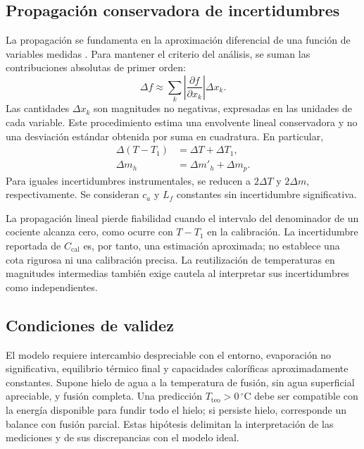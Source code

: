 \subsection{Propagación conservadora de incertidumbres}
La propagación se fundamenta en la aproximación diferencial de una función de variables medidas \cite{taylor}. Para mantener el criterio del análisis, se suman las contribuciones absolutas de primer orden:
\begin{equation}
  \Delta f\approx\sum_k\left|\frac{\partial f}{\partial x_k}\right|\Delta x_k.
  \label{eq:propagacion}
\end{equation}
Las cantidades $\Delta x_k$ son magnitudes no negativas, expresadas en las unidades de cada variable. Este procedimiento estima una envolvente lineal conservadora y no una desviación estándar obtenida por suma en cuadratura. En particular,
\begin{align}
  \Delta(T-T_1)&=\Delta T+\Delta T_1,\label{eq:incertidumbre_diferencia}\\
  \Delta m_h&=\Delta m'_h+\Delta m_p.\label{eq:incertidumbre_masa_hielo}
\end{align}
Para iguales incertidumbres instrumentales, se reducen a $2\Delta T$ y $2\Delta m$, respectivamente. Se consideran $c_a$ y $L_f$ constantes sin incertidumbre significativa.

La propagación lineal pierde fiabilidad cuando el intervalo del denominador de un cociente alcanza cero, como ocurre con $T-T_1$ en la calibración. La incertidumbre reportada de $C_{\mathrm{cal}}$ es, por tanto, una estimación aproximada; no establece una cota rigurosa ni una calibración precisa. La reutilización de temperaturas en magnitudes intermedias también exige cautela al interpretar sus incertidumbres como independientes.

\subsection{Condiciones de validez}
El modelo requiere intercambio despreciable con el entorno, evaporación no significativa, equilibrio térmico final y capacidades caloríficas aproximadamente constantes. Supone hielo de agua a la temperatura de fusión, sin agua superficial apreciable, y fusión completa. Una predicción $T_{\mathrm{teo}}>0\,{}^{\circ}\mathrm{C}$ debe ser compatible con la energía disponible para fundir todo el hielo; si persiste hielo, corresponde un balance con fusión parcial. Estas hipótesis delimitan la interpretación de las mediciones y de sus discrepancias con el modelo ideal.
